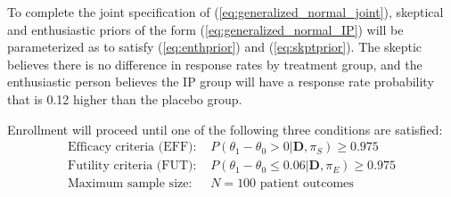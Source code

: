 \documentclass[12pt]{article}
\begin{document}
To complete the joint specification of (\ref{eq:generalized_normal_joint}), skeptical and enthusiastic priors of the form (\ref{eq:generalized_normal_IP}) will be parameterized as to satisfy (\ref{eq:enthprior}) and (\ref{eq:skptprior}). The skeptic believes there is no difference in response rates by treatment group, and the enthusiastic person believes the IP group will have a response rate probability that is 0.12 higher than the placebo group. 

%



%				

Enrollment will proceed until one of the following three conditions are satisfied:
\begin{align*}
\text{Efficacy criteria (EFF): }&P(\theta_1-\theta_0>0|\mathbf{D},\pi_S)\geq 0.975\\
\text{Futility criteria (FUT): }&P(\theta_1-\theta_0 \leq 0.06|\mathbf{D},\pi_E)\geq 0.975\\
\text{Maximum sample size: }&N=100 \text{ patient outcomes}
\end{align*}
\end{document}
